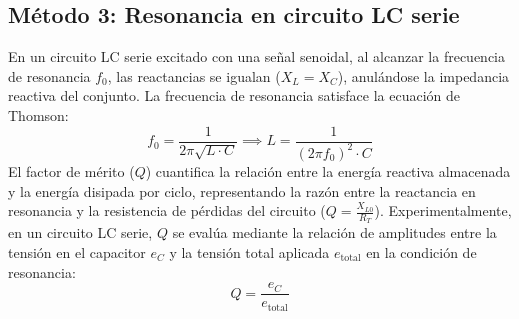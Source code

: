 \subsection{Método 3: Resonancia en circuito LC serie}
En un circuito LC serie excitado con una señal senoidal, al alcanzar la frecuencia de resonancia $f_0$, las reactancias
se igualan ($X_L = X_C$), anulándose la impedancia reactiva del conjunto. La frecuencia de resonancia satisface la
ecuación de Thomson:
\begin{equation}
    f_0 = \frac{1}{2 \pi \sqrt{L \cdot C}} \implies L = \frac{1}{(2 \pi f_0)^2 \cdot C}
    \label{eq.ej3:formula_thomson}
\end{equation}
El factor de mérito ($Q$) cuantifica la relación entre la energía reactiva almacenada y la energía disipada por ciclo,
representando la razón entre la reactancia en resonancia y la resistencia de pérdidas del circuito
($Q = \frac{X_{L0}}{R_T}$). Experimentalmente, en un circuito LC serie, $Q$ se evalúa mediante la relación de amplitudes
entre la tensión en el capacitor $e_C$ y la tensión total aplicada $e_{\text{total}}$ en la condición de resonancia:
\begin{equation}
    Q = \frac{e_C}{e_{\text{total}}}
    \label{eq.ej3:factor_Q}
\end{equation}
